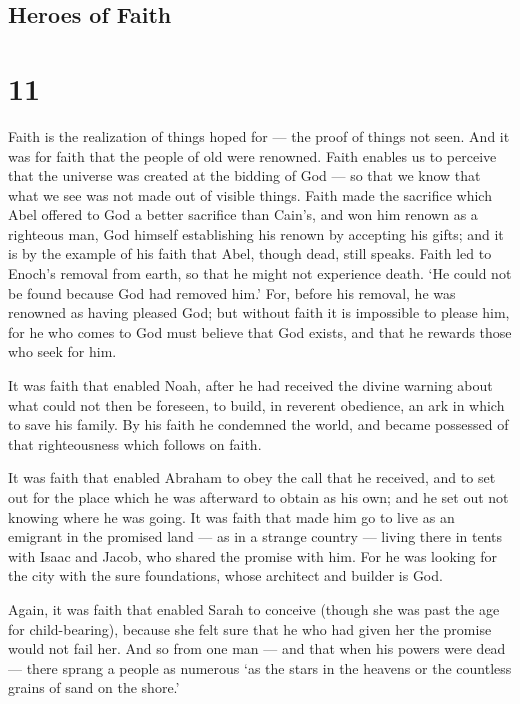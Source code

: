 \hypertarget{heroes-of-faith}{%
\subsection{Heroes of Faith}\label{heroes-of-faith}}

\hypertarget{section-10}{%
\section{11}\label{section-10}}

 Faith is the realization of things hoped for --- the proof
of things not seen.  And it was for faith that the people of
old were renowned.  Faith enables us to perceive that the
universe was created at the bidding of God --- so that we know that what
we see was not made out of visible things.  Faith made the
sacrifice which Abel offered to God a better sacrifice than Cain's, and
won him renown as a righteous man, God himself establishing his renown
by accepting his gifts; and it is by the example of his faith that Abel,
though dead, still speaks.  Faith led to Enoch's removal
from earth, so that he might not experience death. `He could not be
found because God had removed him.' For, before his removal, he was
renowned as having pleased God;  but without faith it is
impossible to please him, for he who comes to God must believe that God
exists, and that he rewards those who seek for him.

 It was faith that enabled Noah, after he had received the
divine warning about what could not then be foreseen, to build, in
reverent obedience, an ark in which to save his family. By his faith he
condemned the world, and became possessed of that righteousness which
follows on faith.

 It was faith that enabled Abraham to obey the call that he
received, and to set out for the place which he was afterward to obtain
as his own; and he set out not knowing where he was going. 
It was faith that made him go to live as an emigrant in the promised
land --- as in a strange country --- living there in tents with Isaac
and Jacob, who shared the promise with him.  For he was
looking for the city with the sure foundations, whose architect and
builder is God.

 Again, it was faith that enabled Sarah to conceive (though
she was past the age for child-bearing), because she felt sure that he
who had given her the promise would not fail her.  And so
from one man --- and that when his powers were dead --- there sprang a
people as numerous `as the stars in the heavens or the countless grains
of sand on the shore.'

